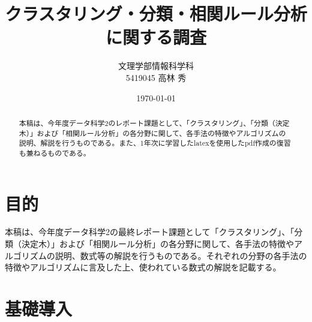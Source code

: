 \documentclass[dvipdfmx]{jsarticle}
\title{クラスタリング・分類・相関ルール分析に関する調査}
\author{文理学部情報科学科\\5419045 高林 秀}
\date{\today}
\begin{document}
\maketitle

\begin{abstract}
本稿は、今年度データ科学2のレポート課題として、「クラスタリング」、「分類（決定木）」および「相関ルール分析」の各分野に関して、各手法の特徴やアルゴリズムの説明、解説を行うものである。また、1年次に学習したlatexを使用したpdf作成の復習も兼ねるものである。
\end{abstract}

\section{目的}
本稿は、今年度データ科学2の最終レポート課題として「クラスタリング」、「分類（決定木）」および「相関ルール分析」の各分野に関して、各手法の特徴やアルゴリズムの説明、数式等の解説を行うものである。それぞれの分野の各手法の特徴やアルゴリズムに言及した上、使われている数式の解説を記載する。
\section{基礎導入}
\end{document}
